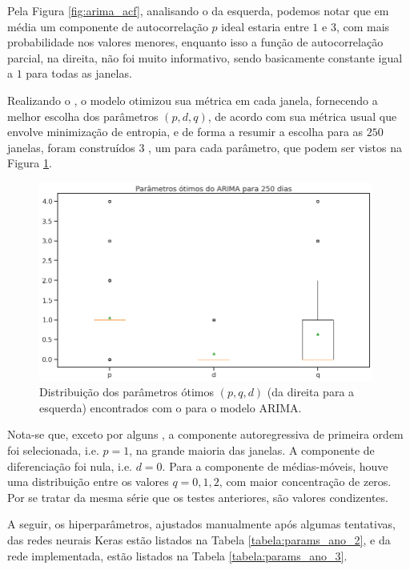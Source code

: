 Pela Figura \ref{fig:arima_acf}, analisando o  da esquerda, podemos notar que em média um componente de autocorrelação $p$ ideal estaria entre $1$ e $3$, com mais probabilidade nos valores menores, enquanto isso a função de autocorrelação parcial, na direita, não foi muito informativo, sendo basicamente constante igual a $1$ para todas as janelas.

Realizando o , o modelo otimizou sua métrica em cada janela, fornecendo a melhor escolha dos parâmetros $(p, d, q)$, de acordo com sua métrica usual que envolve minimização de entropia, e de forma a resumir a escolha para as $250$ janelas, foram construídos $3$ , um para cada parâmetro, que podem ser vistos na Figura \ref{fig:arima_boxplot}.

\begin{figure}[htb]
\centering
\includegraphics[width=11cm]{figuras/arima_boxplot}
\caption{Distribuição dos parâmetros ótimos $(p, q, d)$ (da direita para a esquerda) encontrados com o  para o modelo ARIMA.}
\label{fig:arima_boxplot}
\end{figure}

Nota-se que, exceto por alguns , a componente autoregressiva de primeira ordem foi selecionada, i.e. $p = 1$, na grande maioria das janelas. A componente de diferenciação foi nula, i.e. $d = 0$. Para a componente de médias-móveis, houve uma distribuição entre os valores $q = 0, 1, 2$, com maior concentração de zeros. Por se tratar da mesma série que os testes anteriores, são valores condizentes.

A seguir, os hiperparâmetros, ajustados manualmente após algumas tentativas, das redes neurais Keras estão listados na Tabela \ref{tabela:params_ano_2}, e da rede  implementada, estão listados na Tabela \ref{tabela:params_ano_3}.

